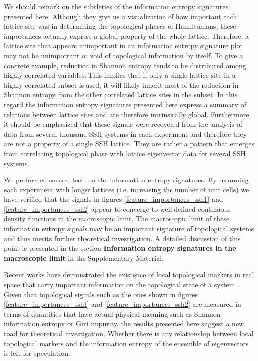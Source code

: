 \documentclass[10pt]{revtex4-1}
\begin{document}
We should remark on the subtleties of the information entropy signatures presented here. Although they give us a visualization of how important each lattice site was in determining the topological phases of Hamiltonians, these importances actually express a global property of the whole lattice. Therefore, a lattice site that appears unimportant in an information entropy signature plot may not be unimportant or void of topological information by itself. To give a concrete example, reduction in Shannon entropy tends to be distributed among highly correlated variables. This implies that if only a single lattice site in a highly correlated subset is used, it will likely inherit most of the reduction in Shannon entropy from the other correlated lattice sites in the subset. In this regard the information entropy signatures presented here express a summary of relations between lattice sites and are therefore intrinsically global. Furthermore, it should be emphasized that these signals were recovered from the analysis of data from several thousand SSH systems in each experiment and therefore they are not a property of a single SSH lattice. They are rather a pattern that emerges from correlating topological phase with lattice eigenvector data for several SSH systems.   

We performed several tests on the information entropy signatures. By rerunning each experiment with longer lattices (i.e. increasing the number of unit cells) we have verified that the signals in figures \ref{feature_importances_ssh1} and \ref{feature_importances_ssh2} appear to converge to well defined continuous density functions in the macroscopic limit. The macroscopic limit of these information entropy signals may be an important signature of topological systems and thus merits further theoretical investigation. A detailed discussion of this point is presented in the section \textbf{Information entropy signatures in the macroscopic limit} in the Supplementary Material.

Recent works have demonstrated the existence of local topological markers in real space that carry important information on the topological state of a system \cite{PhysRevB.84.241106,caio2019topological}.  Given that topological signals such as the ones shown in figures \ref{feature_importances_ssh1} and \ref{feature_importances_ssh2} are measured in terms of quantities that have actual physical meaning such as Shannon information entropy or Gini impurity, the results presented here suggest a new road for theoretical investigation. Whether there is any relationship between local topological markers and the information entropy of the ensemble of eigenvectors is left for speculation.
\end{document}
